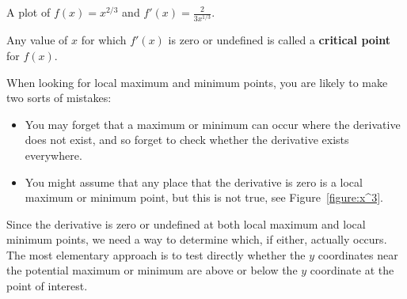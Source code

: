 \begin{marginfigure}[0in]
\caption{A plot of $f(x) = x^{2/3}$ and $f'(x) = \frac{2}{3x^{1/3}}$.}
\label{figure:x^{2/3}}
\end{marginfigure}

\begin{definition}
Any value of $x$ for which $f'(x)$ is zero or undefined is called a
\textbf{critical point} for $f(x)$.
\end{definition}

\begin{warning} 
When looking for local maximum and minimum points, you are likely to
make two sorts of mistakes: 
\begin{itemize}
\item You may forget that a maximum or minimum can occur where the
  derivative does not exist, and so forget to check whether the
  derivative exists everywhere. 
\item You might assume that any place that the derivative is zero is a
  local maximum or minimum point, but this is not true, see Figure~\ref{figure:x^3}.
\end{itemize}
\end{warning}



Since the derivative is zero or undefined at both local maximum and
local minimum points, we need a way to determine which, if either,
actually occurs. The most elementary approach is to test directly
whether the $y$ coordinates near the potential maximum or minimum are
above or below the $y$ coordinate at the point of interest. 

